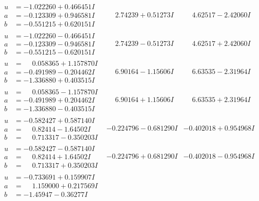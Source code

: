 \documentclass[1p]{elsarticle_modified}
\theoremstyle{definition}
\begin{document}
$$\begin{array}{c|c|c}
\begin{aligned}
u &= -1.022260 + 0.466451 I \\
a &= -0.123309 + 0.946581 I \\
b &= -0.551215 + 0.620151 I\end{aligned}
 & \phantom{-}2.74239 + 0.51273 I & \phantom{-}4.62517 - 2.42060 I \\ \hline\begin{aligned}
u &= -1.022260 - 0.466451 I \\
a &= -0.123309 - 0.946581 I \\
b &= -0.551215 - 0.620151 I\end{aligned}
 & \phantom{-}2.74239 - 0.51273 I & \phantom{-}4.62517 + 2.42060 I \\ \hline\begin{aligned}
u &= \phantom{-}0.058365 + 1.157870 I \\
a &= -0.491989 - 0.204462 I \\
b &= -1.336880 + 0.403515 I\end{aligned}
 & \phantom{-}6.90164 - 1.15606 I & \phantom{-}6.63535 - 2.31964 I \\ \hline\begin{aligned}
u &= \phantom{-}0.058365 - 1.157870 I \\
a &= -0.491989 + 0.204462 I \\
b &= -1.336880 - 0.403515 I\end{aligned}
 & \phantom{-}6.90164 + 1.15606 I & \phantom{-}6.63535 + 2.31964 I \\ \hline\begin{aligned}
u &= -0.582427 + 0.587140 I \\
a &= \phantom{-}0.82414 - 1.64502 I \\
b &= \phantom{-}0.713317 - 0.350203 I\end{aligned}
 & -0.224796 - 0.681290 I & -0.402018 + 0.954968 I \\ \hline\begin{aligned}
u &= -0.582427 - 0.587140 I \\
a &= \phantom{-}0.82414 + 1.64502 I \\
b &= \phantom{-}0.713317 + 0.350203 I\end{aligned}
 & -0.224796 + 0.681290 I & -0.402018 - 0.954968 I \\ \hline\begin{aligned}
u &= -0.733691 + 0.159907 I \\
a &= \phantom{-}1.159000 + 0.217569 I \\
b &= -1.45947 - 0.36277 I\end{aligned}

\end{array}$$
\end{document}
